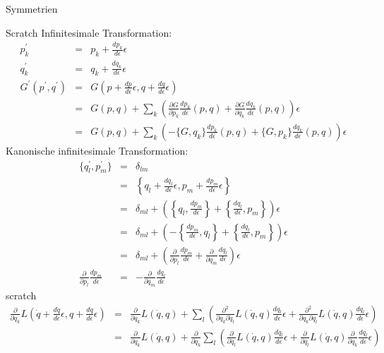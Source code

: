\documentclass[a4paper,fleqn]{article}
\numberwithin{equation}{section}
\begin{document}
\begin{section}{Symmetrien}
\begin{subsection}{Scratch}
Infinitesimale Transformation:
\begin{eqnarray*}
p^\prime_k &=& p_k+\frac{dp_k}{d\epsilon}\epsilon\\
q^\prime_k &=& q_k+\frac{dq_k}{d\epsilon}\epsilon\\
G^\prime(p^\prime,q^\prime) &=& G\left(p+\frac{dp}{d\epsilon}\epsilon,q+\frac{dq}{d\epsilon}\epsilon\right)\\
&=&G(p,q)+\sum_k\left(
\frac{\partial G}{\partial p_k}\frac{dp_k}{d\epsilon}(p,q)+
\frac{\partial G}{\partial q_k}\frac{dq_k}{d\epsilon}(p,q)
\right)\epsilon\\
&=&G(p,q)+\sum_k\left(
-\{G,q_k\}\frac{dp_k}{d\epsilon}(p,q)+
\{G,p_k\}\frac{dq_k}{d\epsilon}(p,q)
\right)\epsilon
\end{eqnarray*}
Kanonische infinitesimale Transformation:
\begin{eqnarray*}
\{q^\prime_l,p^\prime_m\} &=& \delta_{lm}\\
&=& \left\{q_l+\frac{dq_l}{d\epsilon}\epsilon,p_m+\frac{dp_m}{d\epsilon}\epsilon\right\}\\
&=& \delta_{ml}+\left(\left\{q_l,\frac{dp_m}{d\epsilon}\right\}+\left\{\frac{dq_l}{d\epsilon},p_m\right\}\right)\epsilon\\
&=& \delta_{ml}+\left(-\left\{\frac{dp_m}{d\epsilon},q_l\right\}+\left\{\frac{dq_l}{d\epsilon},p_m\right\}\right)\epsilon\\
&=& \delta_{ml}+\left(\frac{\partial}{\partial p_l}\frac{dp_m}{d\epsilon}+\frac{\partial}{\partial q_m}\frac{dq_l}{d\epsilon}\right)\epsilon\\
\frac{\partial}{\partial p_l}\frac{dp_m}{d\epsilon}&=&-\frac{\partial}{\partial q_m}\frac{dq_l}{d\epsilon}
\end{eqnarray*}
scratch
\begin{eqnarray*}
\frac{\partial}{\partial q_k}L\left(\dot{q}+\frac{d\dot{q}}{d\epsilon}\epsilon,q+\frac{dq}{d\epsilon}\epsilon\right) &=&
\frac{\partial}{\partial q_k}L\left(\dot{q},q\right)
+\sum_l\left(\frac{\partial^2}{\partial q_k\partial \dot{q}_l}L\left(\dot{q},q\right)\frac{d\dot{q}_l}{d\epsilon}\epsilon
+\frac{\partial^2}{\partial q_k\partial q_l}L\left(\dot{q},q\right)\frac{dq_l}{d\epsilon}\epsilon\right)\\
&=&\frac{\partial}{\partial q_k}L\left(\dot{q},q\right)
+\frac{\partial}{\partial q_k}\sum_l\left(\frac{\partial}{\partial \dot{q}_l}L\left(\dot{q},q\right)\frac{d\dot{q}_l}{d\epsilon}\epsilon
+\frac{\partial}{\partial q_l}L\left(\dot{q},q\right)\frac{\partial}{\partial q_k}\frac{dq_l}{d\epsilon}\epsilon\right)\\

\end{eqnarray*}
\end{subsection}
\end{section}
\end{document}
